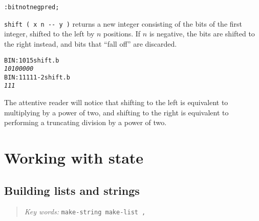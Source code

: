 \documentclass[english]{book}
\newcommand{\chapkeywords}[1]{{\parbox{10cm}{\begin{minipage}[b]{10cm}
\begin{quote}
\emph{Key words:} \texttt{#1}
\end{quote}
\end{minipage}}}}
\begin{document}
\begin{alltt}
: bitnot neg pred ;
\end{alltt}

\texttt{shift ( x n -{}- y )} returns a new integer consisting of the bits of the first integer, shifted to the left by $n$ positions. If $n$ is negative, the bits are shifted to the right instead, and bits that ``fall off'' are discarded.

\begin{alltt}
BIN: 101 5 shift .b
\emph{10100000}
BIN: 11111 -2 shift .b
\emph{111}
\end{alltt}

The attentive reader will notice that shifting to the left is equivalent to multiplying by a power of two, and shifting to the right is equivalent to performing a truncating division by a power of two.

\chapter{Working with state}

\section{Building lists and strings}

\chapkeywords{make-string make-list ,}



\end{document}
